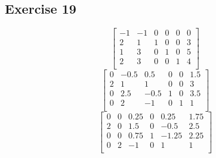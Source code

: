 \documentclass[letterpaper,12pt]{article}
\theoremstyle{definition}
\begin{document}
\subsection*{Exercise 19}
\[
\begin{bmatrix}
 -1 & -1 & 0 & 0 & 0 & 0 \\
  2 &  1 & 1 & 0 & 0 & 3 \\
  1 &  3 & 0 & 1 & 0 & 5 \\
  2 &  3 & 0 & 0 & 1 & 4 \\
\end{bmatrix}
\]
\[
\begin{bmatrix}
 0 & -0.5 &  0.5 & 0 & 0 & 1.5 \\
 2 &  1   &  1   & 0 & 0 & 3   \\
 0 &  2.5 & -0.5 & 1 & 0 & 3.5 \\
 0 &  2   & -1   & 0 & 1 & 1   \\
\end{bmatrix}
\]
\[
\begin{bmatrix}
 0 & 0 &  0.25 & 0 &  0.25 & 1.75 \\
 2 & 0 &  1.5  & 0 & -0.5  & 2.5  \\
 0 & 0 &  0.75 & 1 & -1.25 & 2.25 \\
 0 & 2 & -1    & 0 &  1    & 1    \\
\end{bmatrix}
\]
\end{document}
